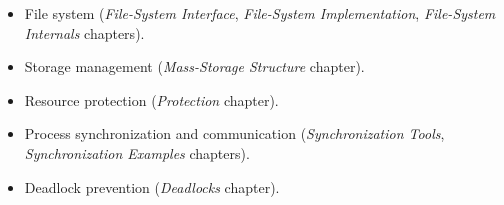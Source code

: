 \documentclass{article}
\begin{document}
\begin{itemize}
\begin{itemize}
\begin{itemize}
            \item File system (\textit{File-System Interface}, \textit{File-System Implementation}, \textit{File-System Internals} chapters).
            \item Storage management (\textit{Mass-Storage Structure} chapter).
            \item Resource protection (\textit{Protection} chapter).
            \item Process synchronization and communication (\textit{Synchronization Tools}, \textit{Synchronization Examples} chapters).
            \item Deadlock prevention (\textit{Deadlocks} chapter).
        \end{itemize}
    \end{itemize}
\end{itemize}
\end{document}
